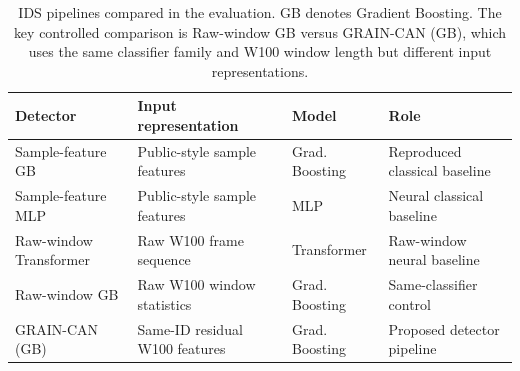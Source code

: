 \documentclass[runningheads]{llncs}
\begin{document}
\begin{table}[H]
\centering
\caption{IDS pipelines compared in the evaluation. GB denotes Gradient Boosting. The key controlled comparison is Raw-window GB versus GRAIN-CAN (GB), which uses the same classifier family and W100 window length but different input representations.}
\label{tab:pipelines}
\small
\setlength{\tabcolsep}{5pt}
\renewcommand{\arraystretch}{1.06}
\begin{tabularx}{\textwidth}{p{} X p{} p{}}
\toprule
Detector & Input representation & Model & Role \\
\midrule
Sample-feature GB & Public-style sample features & Grad. Boosting & Reproduced classical baseline \\
Sample-feature MLP & Public-style sample features & MLP & Neural classical baseline \\
Raw-window Transformer & Raw W100 frame sequence & Transformer & Raw-window neural baseline \\
Raw-window GB & Raw W100 window statistics & Grad. Boosting & Same-classifier control \\
GRAIN-CAN (GB) & Same-ID residual W100 features & Grad. Boosting & Proposed detector pipeline \\
\bottomrule
\end{tabularx}
\end{table}
\end{document}
